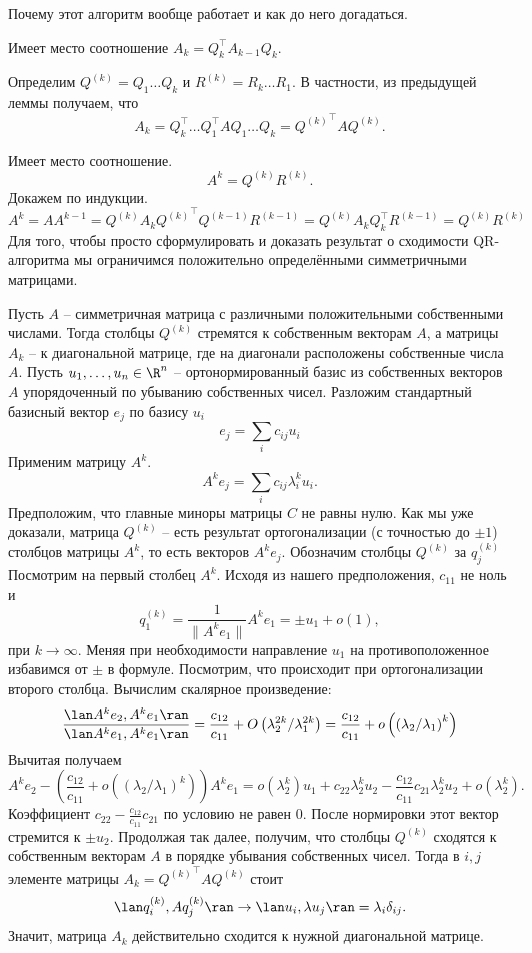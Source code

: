 Почему этот алгоритм вообще работает и как до него догадаться.

\lm Имеет место соотношение $A_k=Q_k^\top A_{k-1} Q_k$.
\elm

Определим $Q^{(k)}=Q_1\dots Q_k$ и $R^{(k)}= R_k \dots R_1$. В частности, из предыдущей леммы получаем, что $$A_k=Q_k^\top \dots Q_1^\top A Q_1 \dots Q_k= {Q^{(k)}}^\top A Q^{(k)}.$$

\lm  Имеет место соотношение. 
$$A^k=Q^{(k)}R^{(k)}.$$
\elm
\proof Докажем по индукции. 
$$A^k=A A^{k-1}= Q^{(k)}A_k{Q^{(k)}}^\top Q^{(k-1)}R^{(k-1)} = Q^{(k)}A_k Q_k^\top R^{(k-1)}=Q^{(k)} R^{(k)}$$
\endproof
Для того, чтобы просто сформулировать и доказать результат о сходимости QR-алгоритма мы ограничимся положительно определёнными симметричными матрицами.

\thrm Пусть $A$ -- симметричная матрица с различными положительными собственными числами. Тогда столбцы $Q^{(k)}$ стремятся к собственным векторам $A$, а матрицы $A_k$ -- к диагональной матрице, где на диагонали расположены собственные числа $A$.
\ethrm
\proof  Пусть $u_1,\dots,u_n \in \R^n$ -- ортонормированный базис из собственных векторов $A$ упорядоченный по убыванию собственных чисел.
Разложим стандартный базисный вектор $e_j$ по базису $u_i$
$$e_j = \sum_i c_{ij} u_i $$
Применим матрицу $A^k$. 
$$A^k e_j = \sum_i c_{ij} \lambda_i^k u_i.$$
Предположим, что главные миноры матрицы $C$ не равны нулю.
Как мы уже доказали, матрица $Q^{(k)}$ -- есть результат ортогонализации (с точностью до $\pm 1$) столбцов матрицы $A^k$, то есть векторов $A^k e_j$. Обозначим столбцы $Q^{(k)}$ за $q^{(k)}_j$ Посмотрим на первый столбец $A^k$. Исходя из нашего предположения, $c_{11}$ не ноль и
$$q^{(k)}_1=\frac1{\|A^ke_1\|} A^k e_1 = \pm u_1 + o(1),$$
при $k\to \infty$. Меняя при необходимости направление $u_1$ на противоположенное избавимся от $\pm$ в формуле. Посмотрим, что происходит при ортогонализации второго столбца. Вычислим скалярное произведение:
$$\frac{\lan A^k e_2, A^k e_1 \ran}{\lan A^k e_1, A^k e_1 \ran} = \frac{c_{12}}{c_{11}}+ O\left( \lambda_2^{2k}/\lambda_1^{2k}\right)
=\frac{c_{12}}{c_{11}}+ o \left(\left(\lambda_2/\lambda_1 \right)^k\right)  $$
Вычитая получаем
$$ A^k e_2 - \left(\frac{c_{12}}{c_{11}}+ o \left(\left(\lambda_2/\lambda_1\right)^k\right)\right) A^k e_1= o(\lambda_2^k)u_1+ c_{22}\lambda_2^ku_2 - \frac{c_{12}}{c_{11}}c_{21}\lambda_2^k u_2 +o(\lambda_2^k).$$
Коэффициент $c_{22}-\frac{c_{12}}{c_{11}}c_{21}$ по условию не равен $0$. После нормировки этот вектор стремится к $\pm u_2$. Продолжая так далее, получим, что столбцы $Q^{(k)}$ сходятся к собственным векторам $A$ в порядке убывания собственных чисел. Тогда в $i,j$ элементе матрицы $A_k={Q^{(k)}}^\top A Q^{(k)}$  стоит
$$\lan q^{(k)}_i, Aq^{(k)}_j\ran \to \lan u_i, \lambda u_j \ran = \lambda_i \delta_{ij}.$$
Значит, матрица $A_k$ действительно сходится к нужной диагональной матрице.
\endproof



